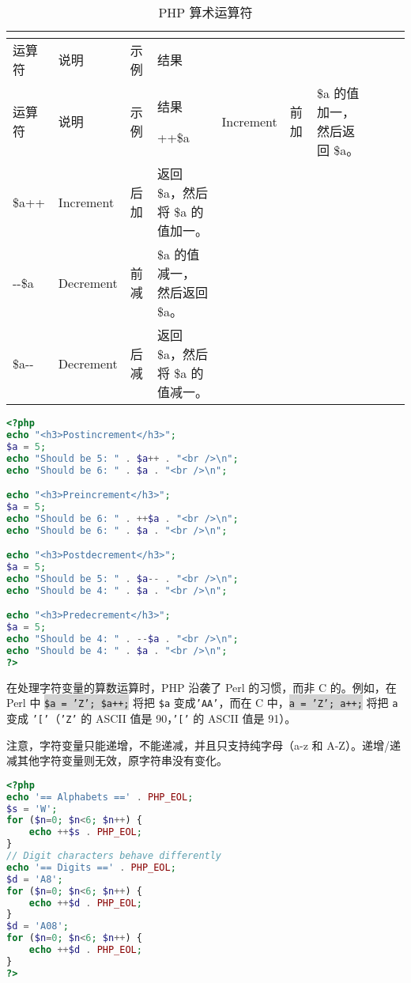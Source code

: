 \begin{longtable}{|m{35pt}|m{130pt}|m{50pt}|m{150pt}|}
\tabularnewline\hline
运算符	&说明	&示例	&结果
\endhead

\caption{PHP 算术运算符}\\
\hline
运算符	&说明	&示例	&结果
\endfirsthead

\endfoot

\endlastfoot
\hline
++\$a	&Increment		&  前加	&\$a 的值加一，然后返回 \$a。\\
\hline
\$a++	&Increment		&后加	& 返回 \$a，然后将 \$a 的值加一。\\
\hline
-\/-\$a	&Decrement	&前减	&\$a 的值减一， 然后返回 \$a。\\
\hline
\$a-\/- 	&Decrement	&后减	&返回 \$a，然后将 \$a 的值减一。\\
\hline
\end{longtable}


\begin{lstlisting}[language=PHP]
<?php
echo "<h3>Postincrement</h3>";
$a = 5;
echo "Should be 5: " . $a++ . "<br />\n";
echo "Should be 6: " . $a . "<br />\n";

echo "<h3>Preincrement</h3>";
$a = 5;
echo "Should be 6: " . ++$a . "<br />\n";
echo "Should be 6: " . $a . "<br />\n";

echo "<h3>Postdecrement</h3>";
$a = 5;
echo "Should be 5: " . $a-- . "<br />\n";
echo "Should be 4: " . $a . "<br />\n";

echo "<h3>Predecrement</h3>";
$a = 5;
echo "Should be 4: " . --$a . "<br />\n";
echo "Should be 4: " . $a . "<br />\n";
?>
\end{lstlisting}

在处理字符变量的算数运算时，PHP 沿袭了 Perl 的习惯，而非 C 的。例如，在 Perl 中 \colorbox{lightgray}{\texttt{\$a = 'Z'; \$a++;}} 将把 \texttt{\$a} 变成\texttt{'AA'}，而在 C 中，\colorbox{lightgray}{\texttt{a = 'Z'; a++;}} 将把 \texttt{a} 变成 \texttt{'['}（\texttt{'Z'} 的 ASCII 值是 90，\texttt{'['} 的 ASCII 值是 91）。

注意，字符变量只能递增，不能递减，并且只支持纯字母（a-z 和 A-Z）。递增/递减其他字符变量则无效，原字符串没有变化。

\begin{lstlisting}[language=PHP]
<?php
echo '== Alphabets ==' . PHP_EOL;
$s = 'W';
for ($n=0; $n<6; $n++) {
    echo ++$s . PHP_EOL;
}
// Digit characters behave differently
echo '== Digits ==' . PHP_EOL;
$d = 'A8';
for ($n=0; $n<6; $n++) {
    echo ++$d . PHP_EOL;
}
$d = 'A08';
for ($n=0; $n<6; $n++) {
    echo ++$d . PHP_EOL;
}
?>
\end{lstlisting}

